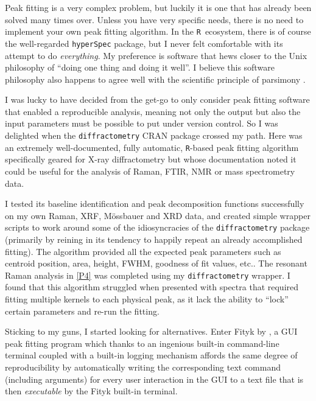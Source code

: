 \documentclass[webedition,openright,titles,swedish,english]{LuaUUThesis}\usepackage[]{graphicx}\usepackage[]{xcolor}
\newcommand{\R}{\texttt{R}}
\newcommand{\Rpackage}[1]{\texttt{#1}}
\newcommand{\etc}{etc.}
\begin{document}
Peak fitting is a very complex problem, but luckily it is one that has already
been solved many times over. Unless you have very
specific needs, there is no need to implement your own peak fitting algorithm.
In the \R\ ecosystem, there is of course the well-regarded \Rpackage{hyperSpec} package,
but I never felt comfortable with its attempt to do \emph{everything}.
My preference is software that hews closer to the Unix philosophy of
\enquote{doing one thing and doing it well}. I believe this software philosophy
also happens to agree well with the scientific principle
of parsimony \cite{Gauch2003}.

I was lucky to have decided from the get-go to only consider peak fitting
software that enabled a reproducible analysis, meaning not only the output
but also the input parameters must be possible to put under version control.
So I was delighted when the \texttt{diffractometry} CRAN package crossed my path.
Here was an extremely well-documented, fully automatic, \R-based peak fitting
algorithm \cite{Davies2008}
specifically geared for X-ray diffractometry but whose documentation \cite{Davies2010}
noted it could be useful for the analysis of Raman, FTIR, NMR or mass spectrometry data.

I tested its baseline identification and peak decomposition functions successfully
on my own Raman, \gls{XRF}, Mössbauer and \gls{XRD} data, and created simple
wrapper scripts to work around some of the idiosyncracies of the \texttt{diffractometry}
package (primarily by reining in its tendency to happily repeat an already accomplished fitting).
The algorithm provided all the expected peak parameters such as centroid position,
area, height, \gls{FWHM}, goodness of fit values, \etc.
The resonant Raman analysis in \cref{P4} was completed using my \texttt{diffractometry} wrapper.
I found that this algorithm struggled when presented with spectra that required
fitting multiple kernels to each physical peak, as it lack the ability to \enquote{lock}
certain parameters and re-run the fitting.

Sticking to my guns, I started looking for alternatives.
Enter Fityk by \textcite{Wojdyr2010}, a GUI peak fitting program which thanks to
an ingenious built-in command-line terminal coupled with a built-in logging
mechanism affords the same degree of reproducibility by
automatically writing the corresponding text command (including arguments) for
every user interaction in the GUI to a text file that is then \emph{executable}
by the Fityk built-in terminal.
\end{document}
